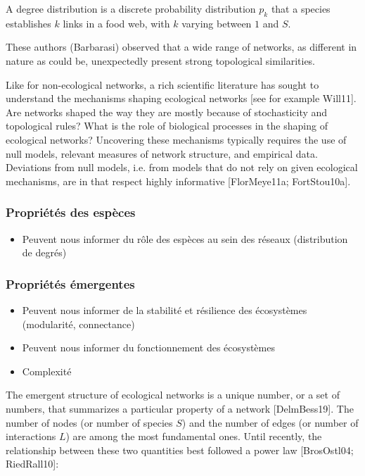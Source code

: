 A degree
distribution is a discrete probability distribution $p_k$ that a species
establishes $k$ links in a food web, with $k$ varying between $1$ and $S$.

These authors (Barbarasi) observed that a wide range of
networks, as different in nature as could be, unexpectedly present strong
topological similarities.

Like
for non-ecological networks, a rich scientific literature has sought to
understand the mechanisms shaping ecological networks [see for example Will11].
Are networks shaped the way they are mostly because of stochasticity and
topological rules? What is the role of biological processes in the shaping of
ecological networks? Uncovering these mechanisms typically requires the use of
null models, relevant measures of network structure, and empirical data.
Deviations from null models, i.e. from models that do not rely on given
ecological mechanisms, are in that respect highly informative [FlorMeye11a;
FortStou10a].

\subsubsection{Propriétés des espèces} 

\begin{itemize}
    \item Peuvent nous informer du rôle des espèces au sein des réseaux (distribution de degrés)
\end{itemize}

\subsubsection{Propriétés émergentes} 

\begin{itemize}
    \item Peuvent nous informer de la stabilité et résilience des écosystèmes (modularité, connectance)
    \item Peuvent nous informer du fonctionnement des écosystèmes 
    \item Complexité 
\end{itemize}

The emergent structure of ecological networks is a unique number, or a set of
numbers, that summarizes a particular property of a network [DelmBess19]. The
number of nodes (or number of species $S$) and the number of edges (or number of
interactions $L$) are among the most fundamental ones. Until recently, the
relationship between these two quantities best followed a power law
[BrosOstl04; RiedRall10]:

